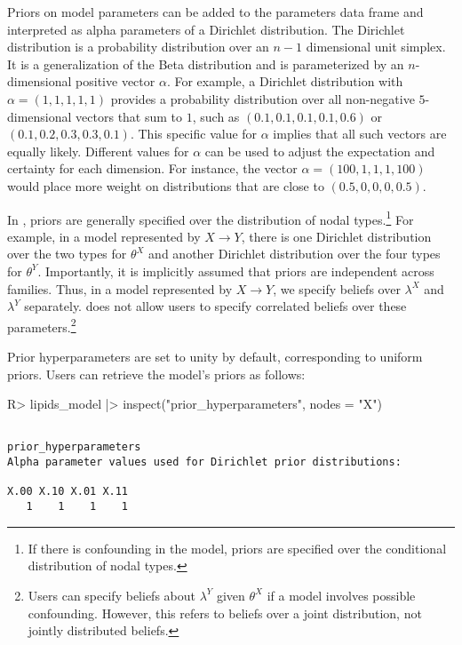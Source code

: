 \documentclass[
  11pt,
  article]{jss}
\begin{document}
Priors on model parameters can be added to the parameters data frame and
interpreted as alpha parameters of a Dirichlet distribution. The
Dirichlet distribution is a probability distribution over an \(n-1\)
dimensional unit simplex. It is a generalization of the Beta
distribution and is parameterized by an \(n\)-dimensional positive
vector \(\alpha\). For example, a Dirichlet distribution with
\(\alpha = (1, 1, 1, 1, 1)\) provides a probability distribution over
all non-negative \(5\)-dimensional vectors that sum to \(1\), such as
\((0.1, 0.1, 0.1, 0.1, 0.6)\) or \((0.1, 0.2, 0.3, 0.3, 0.1)\). This
specific value for \(\alpha\) implies that all such vectors are equally
likely. Different values for \(\alpha\) can be used to adjust the
expectation and certainty for each dimension. For instance, the vector
\(\alpha = (100, 1, 1, 1, 100)\) would place more weight on
distributions that are close to \((0.5, 0, 0, 0, 0.5)\).

In , priors are generally specified over the
distribution of nodal types.\footnote{If there is confounding in the
  model, priors are specified over the conditional distribution of nodal
  types.} For example, in a model represented by \(X \rightarrow Y\),
there is one Dirichlet distribution over the two types for \(\theta^X\)
and another Dirichlet distribution over the four types for \(\theta^Y\).
Importantly, it is implicitly assumed that priors are independent across
families. Thus, in a model represented by \(X \rightarrow Y\), we
specify beliefs over \(\lambda^X\) and \(\lambda^Y\) separately.
 does not allow users to specify correlated beliefs
over these parameters.\footnote{Users can specify beliefs about
  \(\lambda^Y\) given \(\theta^X\) if a model involves possible
  confounding. However, this refers to beliefs over a joint
  distribution, not jointly distributed beliefs.}

Prior hyperparameters are set to unity by default, corresponding to
uniform priors. Users can retrieve the model's priors as follows:

\begin{CodeInput}
R> lipids_model |> inspect("prior_hyperparameters", nodes = "X") 
\end{CodeInput}

\begin{verbatim}

prior_hyperparameters
Alpha parameter values used for Dirichlet prior distributions:

X.00 X.10 X.01 X.11 
   1    1    1    1 
\end{verbatim}
\end{document}
